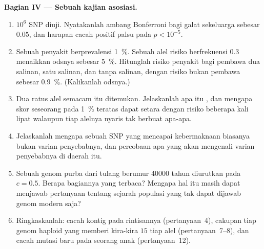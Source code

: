 \begin{problem}
\medskip
\noindent\textbf{Bagian IV --- Sebuah kajian asosiasi.}
\begin{enumerate}[resume]
  \item $10^{6}$ SNP diuji. Nyatakanlah ambang Bonferroni bagi galat
        sekeluarga sebesar $0.05$, dan harapan cacah positif palsu pada
        $p < 10^{-5}$.
  \item Sebuah penyakit berprevalensi \qty{1}{\%}. Sebuah alel risiko
        berfrekuensi $0.3$ menaikkan odsnya sebesar \qty{5}{\%}. Hitunglah
        risiko penyakit bagi pembawa dua salinan, satu salinan, dan tanpa
        salinan, dengan risiko bukan pembawa sebesar \qty{0.9}{\%}.
        (Kalikanlah odsnya.)
  \item Dua ratus alel semacam itu ditemukan. Jelaskanlah apa itu , dan mengapa skor seseorang pada \qty{1}{\%} teratas
        dapat setara dengan risiko beberapa kali lipat walaupun tiap
        alelnya nyaris tak berbuat apa-apa.
  \item Jelaskanlah mengapa sebuah SNP yang mencapai kebermaknaan biasanya
        bukan varian penyebabnya, dan percobaan apa yang akan mengenali
        varian penyebabnya di daerah itu.
  \item Sebuah genom purba dari tulang berumur \num{40000} tahun diurutkan
        pada $c = 0.5$. Berapa bagiannya yang terbaca? Mengapa hal itu masih
        dapat menjawab pertanyaan tentang sejarah populasi yang tak dapat
        dijawab genom modern saja?
  \item Ringkaskanlah: cacah kontig pada  rintisannya
        (pertanyaan~4), cakupan tiap genom haploid yang memberi kira-kira
        $15$  tiap alel (pertanyaan~7--8), dan cacah mutasi baru
        pada seorang anak (pertanyaan~12).
\end{enumerate}
\end{problem}
